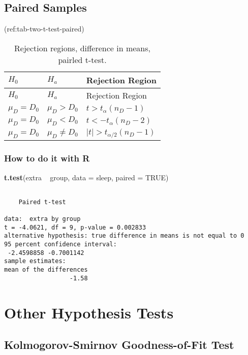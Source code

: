 \documentclass[]{book}
\newenvironment{Shaded}{\begin{snugshade}}{\end{snugshade}}
\newcommand{\KeywordTok}[1]{\textcolor[rgb]{0.13,0.29,0.53}{\textbf{{#1}}}}
\newcommand{\DataTypeTok}[1]{\textcolor[rgb]{0.13,0.29,0.53}{{#1}}}
\newcommand{\StringTok}[1]{\textcolor[rgb]{0.31,0.60,0.02}{{#1}}}
\newcommand{\OtherTok}[1]{\textcolor[rgb]{0.56,0.35,0.01}{{#1}}}
\newcommand{\NormalTok}[1]{{#1}}
\numberwithin{equation}{chapter}
\numberwithin{figure}{chapter}
\theoremstyle{plain}
\theoremstyle{definition}
\theoremstyle{remark}
\theoremstyle{definition}
\theoremstyle{definition}
\theoremstyle{remark}
\begin{document}
\subsection{Paired Samples}\label{paired-samples}

(ref:tab-two-t-test-paired)

\begin{longtable}[]{@{}lll@{}}
\caption{Rejection regions, difference in means, pairled
t-test.}\tabularnewline
\toprule
\(H_{0}\) & \(H_{a}\) & Rejection Region\tabularnewline
\midrule
\endfirsthead
\toprule
\(H_{0}\) & \(H_{a}\) & Rejection Region\tabularnewline
\midrule
\endhead
\(\mu_{D} = D_{0}\) & \(\mu_{D} > D_{0}\) &
\(t > t_{\alpha}(n_{D} - 1)\)\tabularnewline
\(\mu_{D} = D_{0}\) & \(\mu_{D} < D_{0}\) &
\(t < -t_{\alpha}(n_{D} - 2)\)\tabularnewline
\(\mu_{D} = D_{0}\) & \(\mu_{D} \neq D_{0}\) &
\(\vert t \vert > t_{\alpha/2}(n_{D} - 1)\)\tabularnewline
\bottomrule
\end{longtable}

\subsubsection{How to do it with R}\label{how-to-do-it-with-r-42}

\begin{Shaded}
\begin{Highlighting}[]
\KeywordTok{t.test}\NormalTok{(extra ~}\StringTok{ }\NormalTok{group, }\DataTypeTok{data =} \NormalTok{sleep, }\DataTypeTok{paired =} \OtherTok{TRUE}\NormalTok{)}
\end{Highlighting}
\end{Shaded}

\begin{verbatim}

    Paired t-test

data:  extra by group
t = -4.0621, df = 9, p-value = 0.002833
alternative hypothesis: true difference in means is not equal to 0
95 percent confidence interval:
 -2.4598858 -0.7001142
sample estimates:
mean of the differences 
                  -1.58 
\end{verbatim}

\section{Other Hypothesis Tests}\label{sec-other-hypothesis-tests}

\subsection{Kolmogorov-Smirnov Goodness-of-Fit
Test}\label{sub-kolmogorov-smirnov-goodness-of-fit-test}
\end{document}
